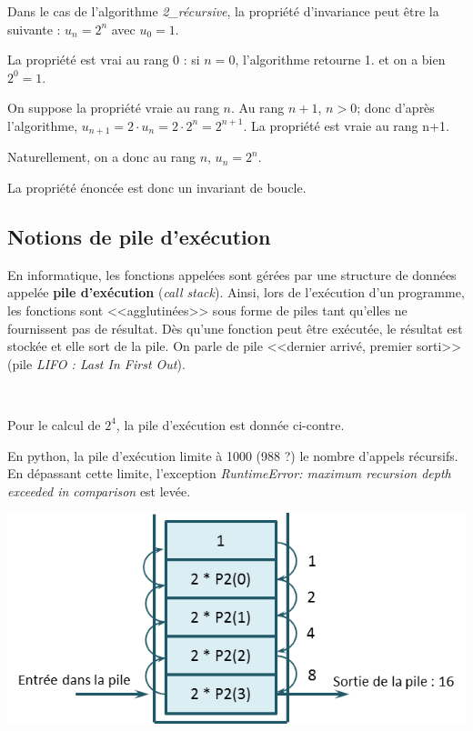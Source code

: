 \documentclass[10pt,fleqn]{article} %
\begin{document}
\begin{exemple}
Dans le cas de l'algorithme \textsl{2\_récursive}, la propriété d'invariance peut être la suivante : $u_n = 2^n$ avec $u_0 = 1$. 

La propriété est vrai au rang 0 : si $n=0$, l'algorithme retourne 1. et on a bien $2^0=1$.

On suppose la propriété vraie au rang $n$. Au rang $n+1$, $n>0$; donc d'après l'algorithme, $u_{n+1}=2\cdot u_n =2\cdot 2^n = 2^{n+1}$. La propriété est vraie au rang n+1.

Naturellement, on a donc au rang $n$, $u_n = 2^n$. 

La propriété énoncée est donc un invariant de boucle.
\end{exemple}
\subsection{Notions de pile d'exécution}
En informatique, les fonctions appelées sont gérées par une structure de données appelée \textbf{pile d'exécution} (\textit{call stack}). Ainsi, lors de l'exécution d'un programme, les fonctions sont <<agglutinées>> sous forme de piles tant qu'elles ne fournissent pas de résultat.
Dès qu'une fonction peut être exécutée, le résultat est stockée et elle sort de la pile. On parle de pile <<dernier arrivé, premier sorti>> (pile \textit{LIFO : Last In First Out}).

\begin{exemple}
~\\

\begin{minipage}[c]{.57\linewidth}
Pour le calcul de $2^4$, la pile d'exécution est donnée ci-contre. 
\begin{rem}
En python, la pile d'exécution limite à 1000 (988 ?) le nombre d'appels récursifs. En dépassant cette limite, l'exception \textsl{RuntimeError: maximum recursion depth exceeded in comparison
} est levée.
\end{rem}
\end{minipage} \hfill
\begin{minipage}[c]{.4\linewidth}
\begin{center}
\includegraphics[width=\linewidth]{images/pile}
\end{center} 
\end{minipage}
\end{exemple}
\end{document}
